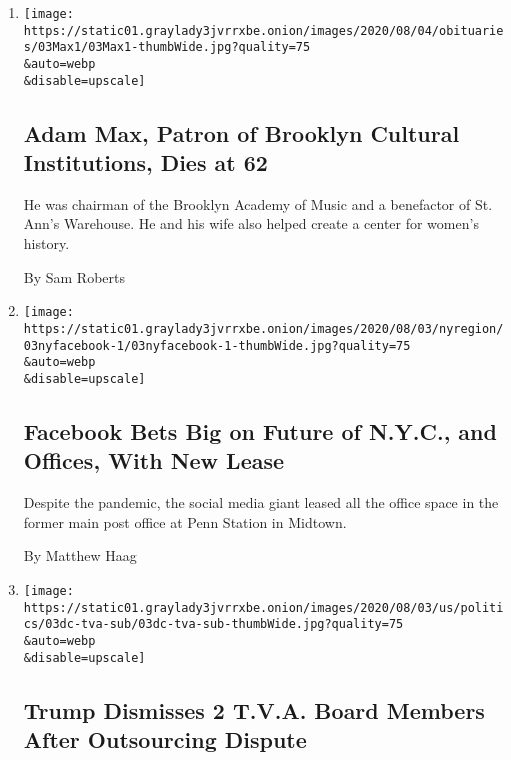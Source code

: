 \begin{enumerate}
\def\labelenumi{\arabic{enumi}.}
\item
  \href{/2020/08/03/arts/adam-max-patron-of-brooklyn-cultural-institutions-dies-at-62.html}{}

  \texttt{[image: https://static01.graylady3jvrrxbe.onion/images/2020/08/04/obituaries/03Max1/03Max1-thumbWide.jpg?quality=75\\\&auto=webp\\\&disable=upscale]}

  \hypertarget{adam-max-patron-of-brooklyn-cultural-institutions-dies-at-62}{%
  \subsection{Adam Max, Patron of Brooklyn Cultural Institutions, Dies
  at
  62}\label{adam-max-patron-of-brooklyn-cultural-institutions-dies-at-62}}

  He was chairman of the Brooklyn Academy of Music and a benefactor of
  St. Ann's Warehouse. He and his wife also helped create a center for
  women's history.

  By Sam Roberts
\item
  \href{/2020/08/03/nyregion/facebook-nyc-office-farley-building.html}{}

  \texttt{[image: https://static01.graylady3jvrrxbe.onion/images/2020/08/03/nyregion/03nyfacebook-1/03nyfacebook-1-thumbWide.jpg?quality=75\\\&auto=webp\\\&disable=upscale]}

  \hypertarget{facebook-bets-big-on-future-of-nyc-and-offices-with-new-lease}{%
  \subsection{Facebook Bets Big on Future of N.Y.C., and Offices, With
  New
  Lease}\label{facebook-bets-big-on-future-of-nyc-and-offices-with-new-lease}}

  Despite the pandemic, the social media giant leased all the office
  space in the former main post office at Penn Station in Midtown.

  By Matthew Haag
\item
  \href{/2020/08/03/us/politics/trump-tennessee-valley-authority.html}{}

  \texttt{[image: https://static01.graylady3jvrrxbe.onion/images/2020/08/03/us/politics/03dc-tva-sub/03dc-tva-sub-thumbWide.jpg?quality=75\\\&auto=webp\\\&disable=upscale]}

  \hypertarget{trump-dismisses-2-tva-board-members-after-outsourcing-dispute}{%
  \subsection{Trump Dismisses 2 T.V.A. Board Members After Outsourcing
  Dispute}\label{trump-dismisses-2-tva-board-members-after-outsourcing-dispute}}


\end{enumerate}
